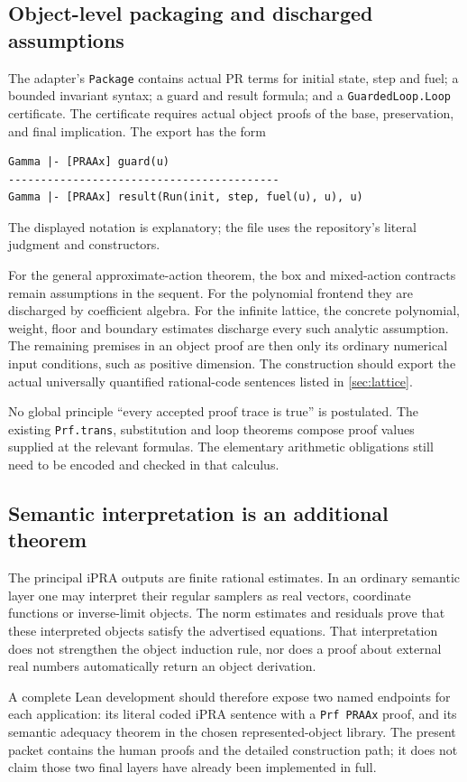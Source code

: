 \subsection{Object-level packaging and discharged assumptions}

The adapter's \texttt{Package} contains actual PR terms for initial
state, step and fuel; a bounded invariant syntax; a guard and
result formula; and a \texttt{GuardedLoop.Loop} certificate.
The certificate requires actual object proofs of the base,
preservation, and final implication. The export has the form
\begin{lstlisting}
Gamma |- [PRAAx] guard(u)
------------------------------------------
Gamma |- [PRAAx] result(Run(init, step, fuel(u), u), u)
\end{lstlisting}
The displayed notation is explanatory; the file uses the repository's
literal judgment and constructors.

For the general approximate-action theorem, the box and mixed-action
contracts remain assumptions in the sequent. For the polynomial
frontend they are discharged by coefficient algebra. For the
infinite lattice, the concrete polynomial, weight, floor and
boundary estimates discharge every such analytic assumption.
The remaining premises in an object proof are then only its
ordinary numerical input conditions, such as positive dimension.
The construction should export the actual universally quantified
rational-code sentences listed in \cref{sec:lattice}.

No global principle ``every accepted proof trace is true'' is
postulated. The existing \texttt{Prf.trans}, substitution and
loop theorems compose proof values supplied at the relevant
formulas. The elementary arithmetic obligations still need to
be encoded and checked in that calculus.

\subsection{Semantic interpretation is an additional theorem}

The principal iPRA outputs are finite rational estimates. In an
ordinary semantic layer one may interpret their regular samplers
as real vectors, coordinate functions or inverse-limit objects.
The norm estimates and residuals prove that these interpreted
objects satisfy the advertised equations. That interpretation
does not strengthen the object induction rule, nor does a proof
about external real numbers automatically return an object
derivation.

A complete Lean development should therefore expose two named
endpoints for each application: its literal coded iPRA sentence
with a \texttt{Prf PRAAx} proof, and its semantic adequacy theorem
in the chosen represented-object library. The present packet
contains the human proofs and the detailed construction path;
it does not claim those two final layers have already been
implemented in full.
